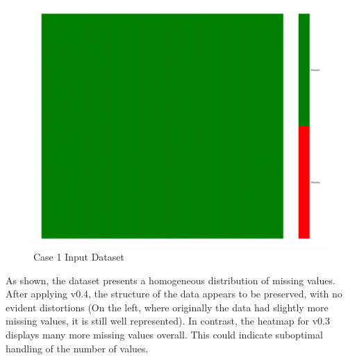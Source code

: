 \documentclass[a4paper,12pt]{article}
\begin{document}
\begin{figure}[H]
    \centering
    \includegraphics[width=0.5\linewidth]{case1_heatmap_erased.png}
    \caption{Case 1 Input Dataset}
\end{figure}

As shown, the dataset presents a homogeneous distribution of missing values. After applying v0.4, the structure of the data appears to be preserved, with no evident distortions (On the left, where originally the data had slightly more missing values, it is still well represented). In contrast, the heatmap for v0.3 displays many more missing values overall. This could indicate suboptimal handling of the number of values.
\end{document}
